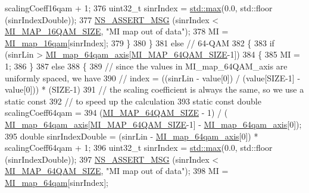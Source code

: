 \begin{DoxyCode}
      scalingCoeff16qam + 1;
376                   uint32\_t sinrIndex = \hyperlink{80211b_8c_affe776513b24d84b39af8ab0930fef7f}{std::max}(0.0, std::floor (sinrIndexDouble));
377                   \hyperlink{assert_8h_aff5ece9066c74e681e74999856f08539}{NS\_ASSERT\_MSG} (sinrIndex < \hyperlink{namespacens3_a9afdb721d53db6fa713ad6255ba2be6f}{MI\_MAP\_16QAM\_SIZE}, \textcolor{stringliteral}{"MI map out
       of data"});
378                   MI = \hyperlink{namespacens3_aafdcfd17fee25ba8ea143f2b73d1791a}{MI\_map\_16qam}[sinrIndex];
379                 \}
380             \}
381           \textcolor{keywordflow}{else} \textcolor{comment}{// 64-QAM}
382             \{
383               \textcolor{keywordflow}{if} (sinrLin > \hyperlink{namespacens3_adbc6d60f5cb8deb6378e7e066a537238}{MI\_map\_64qam\_axis}[\hyperlink{namespacens3_a5d06e4605b670cca6c6a4a64cf5b33d0}{MI\_MAP\_64QAM\_SIZE}-1])
384                 \{
385                   MI = 1;
386                 \}
387               \textcolor{keywordflow}{else}
388                 \{
389                   \textcolor{comment}{// since the values in MI\_map\_64QAM\_axis are uniformly spaced, we have}
390                   \textcolor{comment}{// index = ((sinrLin - value[0]) / (value[SIZE-1] - value[0])) * (SIZE-1)}
391                   \textcolor{comment}{// the scaling coefficient is always the same, so we use a static const}
392                   \textcolor{comment}{// to speed up the calculation}
393                   \textcolor{keyword}{static} \textcolor{keyword}{const} \textcolor{keywordtype}{double} scalingCoeff64qam = 
394                     (\hyperlink{namespacens3_a5d06e4605b670cca6c6a4a64cf5b33d0}{MI\_MAP\_64QAM\_SIZE} - 1) / (
      \hyperlink{namespacens3_adbc6d60f5cb8deb6378e7e066a537238}{MI\_map\_64qam\_axis}[\hyperlink{namespacens3_a5d06e4605b670cca6c6a4a64cf5b33d0}{MI\_MAP\_64QAM\_SIZE}-1] - 
      \hyperlink{namespacens3_adbc6d60f5cb8deb6378e7e066a537238}{MI\_map\_64qam\_axis}[0]);
395                   \textcolor{keywordtype}{double} sinrIndexDouble = (sinrLin -  \hyperlink{namespacens3_adbc6d60f5cb8deb6378e7e066a537238}{MI\_map\_64qam\_axis}[0]) * 
      scalingCoeff64qam + 1;
396                   uint32\_t sinrIndex = \hyperlink{80211b_8c_affe776513b24d84b39af8ab0930fef7f}{std::max}(0.0, std::floor (sinrIndexDouble));
397                   \hyperlink{assert_8h_aff5ece9066c74e681e74999856f08539}{NS\_ASSERT\_MSG} (sinrIndex < \hyperlink{namespacens3_a5d06e4605b670cca6c6a4a64cf5b33d0}{MI\_MAP\_64QAM\_SIZE}, \textcolor{stringliteral}{"MI map out
       of data"});
398                   MI = \hyperlink{namespacens3_addf441339cfdc6e9de9389d58269c19a}{MI\_map\_64qam}[sinrIndex];

\end{DoxyCode}
